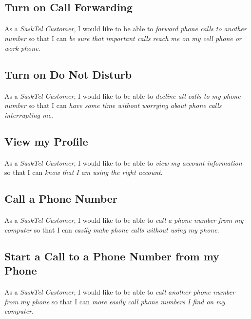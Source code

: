 \documentclass[12pt]{article}
\begin{document}
\subsection{Turn on Call Forwarding}
\paragraph{}	As a \textit{SaskTel Customer}, I would like to be able to \textit{forward phone calls to another number} so that I can \textit{be sure that important calls reach me on my cell phone or work phone}.

\subsection{Turn on Do Not Disturb}
\paragraph{}	As a \textit{SaskTel Customer}, I would like to be able to \textit{decline all calls to my phone number} so that I can \textit{have some time without worrying about phone calls interrupting me}.

\subsection{View my Profile}
\paragraph{}	As a \textit{SaskTel Customer}, I would like to be able to \textit{view my account information} so that I can \textit{know that I am using the right account}.

\subsection{Call a Phone Number}
\paragraph{}	As a \textit{SaskTel Customer}, I would like to be able to \textit{call a phone number from my computer} so that I can \textit{easily make phone calls without using my phone}.

\subsection{Start a Call to a Phone Number from my Phone}
\paragraph{}	As a \textit{SaskTel Customer}, I would like to be able to \textit{call another phone number from my phone} so that I can \textit{more easily call phone numbers I find on my computer}.
\end{document}
